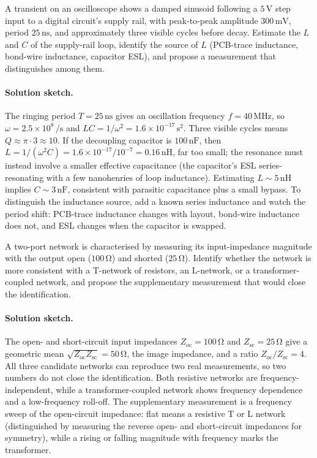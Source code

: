 \begin{exercise}
A transient on an oscilloscope shows a damped sinusoid following a
$5\,\si{\volt}$ step input to a digital circuit's supply rail, with
peak-to-peak amplitude $300\,\si{\milli\volt}$, period $25\,\si{
\nano\second}$, and approximately three visible cycles before decay.
Estimate the $L$ and $C$ of the supply-rail loop, identify the source
of $L$ (PCB-trace inductance, bond-wire inductance, capacitor ESL),
and propose a measurement that distinguishes among them.
\paragraph{Solution sketch.}
The ringing period $T = 25\,\si{\nano\second}$ gives an oscillation
frequency $f = 40\,\si{\mega\hertz}$, so $\omega = 2.5\times 10^{8}\,\si{
\per\second}$ and $LC = 1/\omega^{2} = 1.6\times 10^{-17}\,\si{
\second\squared}$. Three visible cycles means $Q \approx \pi\cdot 3
\approx 10$. If the decoupling capacitor is $100\,\si{\nano\farad}$,
then $L = 1/(\omega^{2}C) = 1.6\times 10^{-17}/10^{-7} = 0.16\,\si{
\nano\henry}$, far too small; the resonance must instead involve a
smaller effective capacitance (the capacitor's ESL series-resonating
with a few nanohenries of loop inductance). Estimating $L \sim 5\,\si{
\nano\henry}$ implies $C \sim 3\,\si{\nano\farad}$, consistent with
parasitic capacitance plus a small bypass. To distinguish the
inductance source, add a known series inductance and watch the period
shift: PCB-trace inductance changes with layout, bond-wire inductance
does not, and ESL changes when the capacitor is swapped.
\end{exercise}

\begin{exercise}
A two-port network is characterised by measuring its input-impedance
magnitude with the output open ($100\,\si{\ohm}$) and shorted ($25
\,\si{\ohm}$). Identify whether the network is more consistent with
a T-network of resistors, an L-network, or a transformer-coupled
network, and propose the supplementary measurement that would close
the identification.
\paragraph{Solution sketch.}
The open- and short-circuit input impedances $Z_{\text{oc}} =
100\,\si{\ohm}$ and $Z_{\text{sc}} = 25\,\si{\ohm}$ give a geometric
mean $\sqrt{Z_{\text{oc}}Z_{\text{sc}}} = 50\,\si{\ohm}$, the image
impedance, and a ratio $Z_{\text{oc}}/Z_{\text{sc}} = 4$. All three
candidate networks can reproduce two real measurements, so two numbers
do not close the identification. Both resistive networks are
frequency-independent, while a transformer-coupled network shows
frequency dependence and a low-frequency roll-off. The supplementary
measurement is a frequency sweep of the open-circuit impedance:
flat means a resistive T or L network (distinguished by measuring the
reverse open- and short-circuit impedances for symmetry), while a
rising or falling magnitude with frequency marks the transformer.
\end{exercise}

